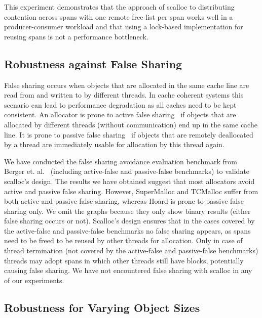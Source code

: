 \documentclass[10pt]{sigplanconf}
\begin{document}
This experiment demonstrates that the approach of scalloc to distributing
contention across spans with one remote free list per span works well in a
producer-consumer workload and that using a lock-based implementation for
reusing spans is not a performance bottleneck.


\subsection{Robustness against False Sharing} 
\label{sec:false-sharing}




False sharing occurs when objects that are allocated in the same cache line are
read from and written to by different threads. In cache coherent
systems this scenario can lead to performance degradation as all caches need to
be kept consistent. An allocator is prone to active false
sharing~\cite{Berger:ASPLOS00} if objects that are allocated by different
threads (without communication) end up in the same cache line. It is prone to
passive false sharing~\cite{Berger:ASPLOS00} if objects that are remotely
deallocated by a thread are immediately usable for allocation by this thread
again.


We have conducted the false sharing
avoidance evaluation benchmark from Berger et. al.~\cite{Berger:ASPLOS00} (including active-false and passive-false benchmarks) to validate
scalloc's design. 
The results we have obtained suggest that most allocators avoid active and passive false sharing. However, SuperMalloc and TCMalloc suffer from both active and passive false sharing,
whereas Hoard is prone to passive false sharing only. 
We omit the graphs because they only show binary results (either false sharing occurs or not).
Scalloc's design ensures that in the cases covered by the active-false and passive-false benchmarks no false sharing
appears, as spans need to be freed to be reused by other threads for
allocation. Only in case of thread termination (not covered by the active-false
and passive-false benchmarks) threads may adopt spans in which other threads still have
blocks, potentially causing false sharing. We have not
encountered false sharing with scalloc in any of our experiments.







\subsection{Robustness for Varying Object Sizes}\label{sec:object-sizes}
\end{document}

